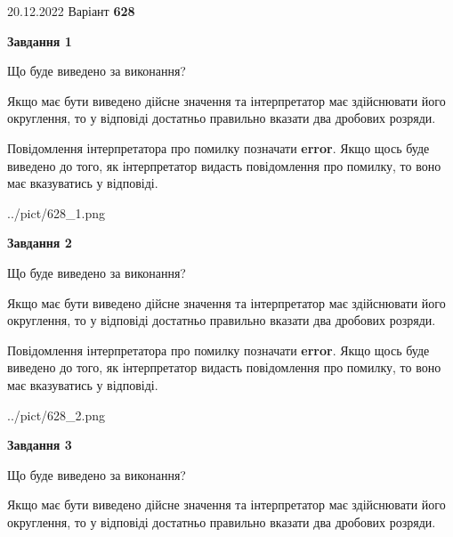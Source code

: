 \documentclass[12pt, ukrainian]{article}
\begin{document}
{20.12.2022 Варіант \No \textbf { 628 }\par}
{
\begin {Large}

{\begin {center}\textbf{Завдання 1}\end {center}}\par
Що буде виведено за виконання? \par

Якщо має бути виведено дійсне значення та інтерпретатор має здійснювати його округлення, 
то у відповіді достатньо правильно вказати два дробових розряди.

Повідомлення інтерпретатора про помилку позначати \textbf{error}.
Якщо щось буде виведено до того, як інтерпретатор видасть повідомлення про помилку, 
то воно має вказуватись у відповіді. \par

\begin{center}
	{../pict/628_1.png}
\end{center}
\newpage

{\begin {center}\textbf{Завдання 2}\end {center}}\par
Що буде виведено за виконання? \par

Якщо має бути виведено дійсне значення та інтерпретатор має здійснювати його округлення, 
то у відповіді достатньо правильно вказати два дробових розряди.

Повідомлення інтерпретатора про помилку позначати \textbf{error}.
Якщо щось буде виведено до того, як інтерпретатор видасть повідомлення про помилку, 
то воно має вказуватись у відповіді. \par

\begin{center}
	{../pict/628_2.png}
\end{center}
\newpage

{\begin {center}\textbf{Завдання 3}\end {center}}\par
Що буде виведено за виконання? \par

Якщо має бути виведено дійсне значення та інтерпретатор має здійснювати його округлення, 
то у відповіді достатньо правильно вказати два дробових розряди.


\end{Large}}
\end{document}
